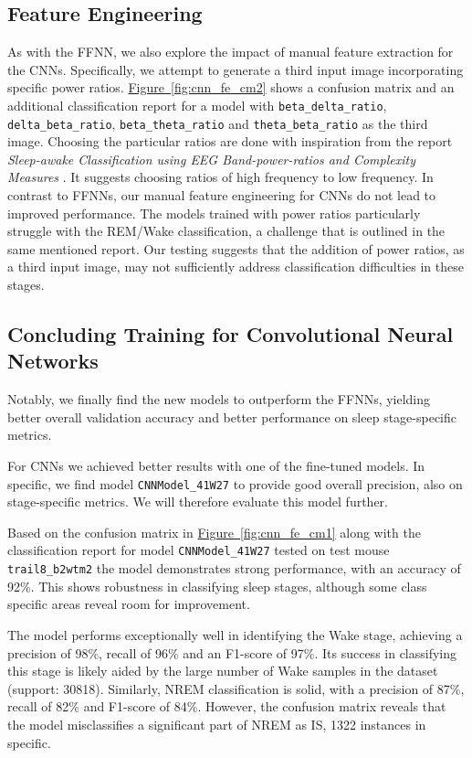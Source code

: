 \documentclass{article}
\begin{document}
\begin{multicols}{2}
\subsection*{Feature Engineering}
As with the FFNN, we also explore the impact of manual feature extraction for the CNNs. Specifically, we attempt to generate a third input image incorporating specific power ratios. \hyperref[fig:cnn_fe_cm1]{Figure~\ref*{fig:cnn_fe_cm2}} shows a confusion matrix and an additional classification report for a model with \texttt{beta\_delta\_ratio}, \texttt{delta\_beta\_ratio}, \texttt{beta\_theta\_ratio} and \texttt{theta\_beta\_ratio} as the third image. Choosing the particular ratios are done with inspiration from the report \textit{Sleep-awake Classification using EEG Band-power-ratios and Complexity Measures} \cite{ganesan_sleep-awake_2020}. It suggests choosing ratios of high frequency to low frequency. In contrast to FFNNs, our manual feature engineering for CNNs do not lead to improved performance. The models trained with power ratios particularly struggle with the REM/Wake classification, a challenge that is outlined in the same mentioned report. Our testing suggests that the addition of power ratios, as a third input image, may not sufficiently address classification difficulties in these stages.

\subsection*{Concluding Training for Convolutional Neural Networks}
 Notably, we finally find the new models to outperform the FFNNs, yielding better overall validation accuracy and better performance on sleep stage-specific metrics. 

For CNNs we achieved better results with one of the fine-tuned models. In specific, we find model \texttt{CNNModel\_41W27} to provide good overall precision, also on stage-specific metrics. We will therefore evaluate this model further. 

Based on the confusion matrix in \hyperref[fig:cnn_fe_cm1]{Figure~\ref*{fig:cnn_fe_cm1}} along with the classification report for model \texttt{CNNModel\_41W27} tested on test mouse \texttt{trail8\_b2wtm2} the model demonstrates strong performance, with an accuracy of 92\%. This shows robustness in classifying sleep stages, although some class specific areas reveal room for improvement.

The model performs exceptionally well in identifying the Wake stage, achieving a precision of 98\%, recall of 96\% and an F1-score of 97\%. Its success in classifying this stage is likely aided by the large number of Wake samples in the dataset (support: 30818). Similarly, NREM classification is solid, with a precision of 87\%, recall of 82\% and F1-score of 84\%. However, the confusion matrix reveals that the model misclassifies a significant part of NREM as IS, 1322 instances in specific. 


\end{multicols}
\end{document}
